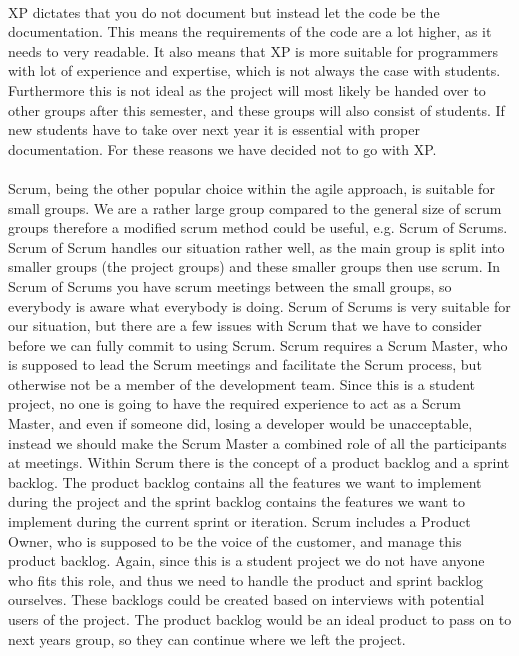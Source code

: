 \paragraph{}
XP dictates that you do not document but instead let the code be the documentation. This means the requirements of the code are a lot higher, as it needs to very readable. It also means that XP is more suitable for programmers with lot of experience and expertise, which is not always the case with students. Furthermore this is not ideal as the project will most likely be handed over to other groups after this semester, and these groups will also consist of students. If new students have to take over next year it is essential with proper documentation. For these reasons we have decided not to go with XP.

\paragraph{}
Scrum, being the other popular choice within the agile approach, is suitable for small groups. We are a rather large group compared to the general size of scrum groups therefore a modified scrum method could be useful, e.g. Scrum of Scrums. Scrum of Scrum handles our situation rather well, as the main group is split into smaller groups (the project groups) and these smaller groups then use scrum. In Scrum of Scrums you have scrum meetings between the small groups, so everybody is aware what everybody is doing.
Scrum of Scrums is very suitable for our situation, but there are a few issues with Scrum that we have to consider before we can fully commit to using Scrum.
Scrum requires a Scrum Master, who is supposed to lead the Scrum meetings and facilitate the Scrum process, but otherwise not be a member of the development team. Since this is a student project, no one is going to have the required experience to act as a Scrum Master, and even if someone did, losing a developer would be unacceptable, instead we should make the Scrum Master a combined role of all the participants at meetings. Within Scrum there is the concept of a product backlog and a sprint backlog. The product backlog contains all the features we want to implement during the project and the sprint backlog contains the features we want to implement during the current sprint or iteration. Scrum includes a Product Owner, who is supposed to be the voice of the customer, and manage this product backlog. Again, since this is a student project we do not have anyone who fits this role, and thus we need to handle the product and sprint backlog ourselves. These backlogs could be created based on interviews with potential users of the project. The product backlog would be an ideal product to pass on to next years group, so they can continue where we left the project.

